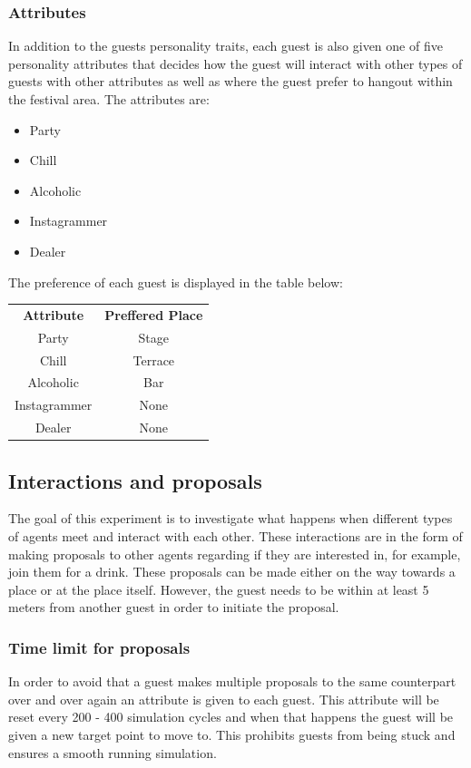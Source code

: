\documentclass[a4paper,10pt]{article}
\begin{document}
\subsubsection{Attributes}
In addition to the guests personality traits, each guest is also given one of five personality attributes that decides how the guest will interact with other types of guests with other attributes as well as where the guest prefer to hangout within the festival area. The attributes are:

\begin{itemize}
    \item Party
    \item Chill
    \item Alcoholic
    \item Instagrammer
    \item Dealer
\end{itemize}

The preference of each guest is displayed in the table below:

\begin{center}
\begin{tabular}{ |c|c| } 
 \hline
 \textbf{Attribute} & \textbf{Preffered Place} \\

 Party & Stage \\ 
 Chill & Terrace  \\ 
 Alcoholic & Bar  \\
 Instagrammer & None \\
 Dealer & None \\
 
 \hline
\end{tabular}
\end{center}

\subsection{Interactions and proposals}

The goal of this experiment is to investigate what happens when different types of agents meet and interact with each other. These interactions are in the form of making proposals to other agents regarding if they are interested in, for example, join them for a drink. These proposals can be made either on the way towards a place or at the place itself. However, the guest needs to be within at least 5 meters from another guest in order to initiate the proposal. 

\subsubsection{Time limit for proposals}
In order to avoid that a guest makes multiple proposals to the same counterpart over and over again an attribute is given to each guest. This attribute will be reset every 200 - 400 simulation cycles and when that happens the guest will be given a new target point to move to. This prohibits guests from being stuck and ensures a smooth running simulation. 
\end{document}
